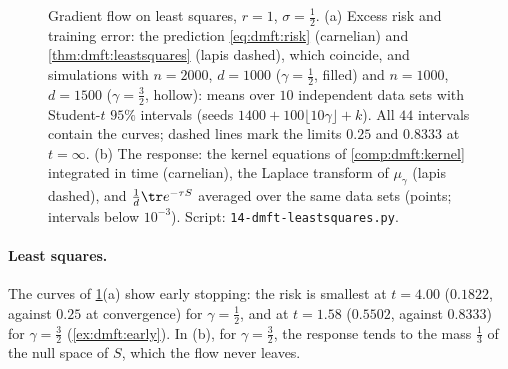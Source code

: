 \begin{refsection}
\begin{figure}[t]
\begin{fullwidth}
\end{fullwidth}
\caption{Gradient flow on least squares, $r=1$, $\sigma=\frac12$. (a) Excess risk and training error: the prediction \eqref{eq:dmft:risk} (carnelian) and \cref{thm:dmft:leastsquares} (lapis dashed), which coincide, and simulations with $n=2000$, $d=1000$ ($\gamma=\frac12$, filled) and $n=1000$, $d=1500$ ($\gamma=\frac32$, hollow): means over $10$ independent data sets with Student-$t$ $95\%$ intervals (seeds $1400+100\lfloor10\gamma\rfloor+k$). All $44$ intervals contain the curves; dashed lines mark the limits $0.25$ and $0.8333$ at $t=\infty$. (b) The response: the kernel equations of \cref{comp:dmft:kernel} integrated in time (carnelian), the Laplace transform of $\mu_\gamma$ (lapis dashed), and $\frac1d\tr e^{-\tau S}$ averaged over the same data sets (points; intervals below $10^{-3}$). Script: \texttt{14-dmft-leastsquares.py}.}\label{fig:dmft:leastsquares}
\end{figure}

\paragraph{Least squares.} The curves of \cref{fig:dmft:leastsquares}(a) show early stopping: the risk is smallest at $t=4.00$ ($0.1822$, against $0.25$ at convergence) for $\gamma=\frac12$, and at $t=1.58$ ($0.5502$, against $0.8333$) for $\gamma=\frac32$ (\cref{ex:dmft:early}). In (b), for $\gamma=\frac32$, the response tends to the mass $\frac13$ of the null space of $S$, which the flow never leaves.


\end{refsection}
